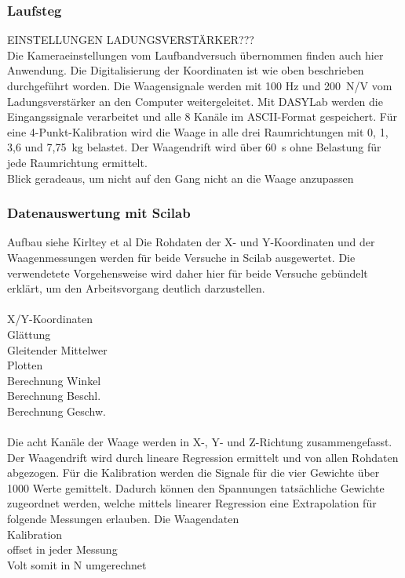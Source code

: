 \subsubsection{Laufsteg}
EINSTELLUNGEN LADUNGSVERSTÄRKER???\\
Die Kameraeinstellungen vom Laufbandversuch übernommen finden auch hier Anwendung. Die Digitalisierung der Koordinaten ist wie oben beschrieben durchgeführt worden. Die Waagensignale werden mit 100 Hz und 200~N/V vom Ladungsverstärker an den Computer weitergeleitet. Mit DASYLab werden die Eingangssignale verarbeitet und alle 8 Kanäle im ASCII-Format gespeichert.
Für eine 4-Punkt-Kalibration wird die Waage in alle drei Raumrichtungen mit 0, 1, 3,6 und 7,75~kg belastet. Der Waagendrift wird über 60~s ohne Belastung für jede Raumrichtung ermittelt.\\
Blick geradeaus, um nicht auf den Gang nicht an die Waage anzupassen


\subsubsection{Datenauswertung mit Scilab}
Aufbau siehe Kirltey et al
Die Rohdaten der X- und Y-Koordinaten und der Waagenmessungen werden für beide Versuche in Scilab ausgewertet. Die verwendetete Vorgehensweise wird daher hier für beide Versuche gebündelt erklärt, um den Arbeitsvorgang deutlich darzustellen.\\\\
X/Y-Koordinaten\\
Glättung\\
Gleitender Mittelwer\\
Plotten\\
Berechnung Winkel\\
Berechnung Beschl.\\
Berechnung Geschw.\\
\\
Die acht Kanäle der Waage werden in X-, Y- und Z-Richtung zusammengefasst. Der Waagendrift wird durch lineare Regression ermittelt und von allen Rohdaten abgezogen.
Für die Kalibration werden die Signale für die vier Gewichte über 1000 Werte gemittelt. Dadurch können den Spannungen tatsächliche Gewichte zugeordnet werden, welche mittels linearer Regression eine Extrapolation für folgende Messungen erlauben. Die 
Waagendaten\\
Kalibration\\
offset in jeder Messung\\
Volt somit in N umgerechnet\\


